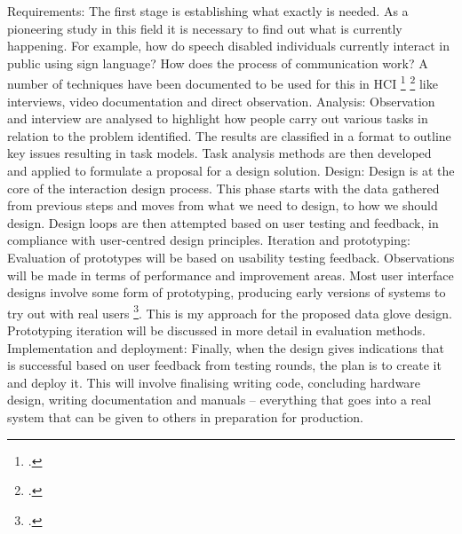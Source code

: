 Requirements: The first stage is establishing what exactly is needed. As a pioneering study in this field it is necessary to find out what is currently happening. For example, how do speech disabled individuals currently interact in public using sign language? How does the process of communication work? 
A number of techniques have been documented to be used for this in HCI \footcite{Dix2004} \footcite{Zimmerman:2007:RTD:1240624.1240704} like interviews, video documentation and direct observation. 
Analysis: Observation and interview are analysed to highlight how people carry out various tasks in relation to the problem identified. The results are classified in a format to outline key issues resulting in task models. Task analysis methods are then developed and applied to formulate a proposal for a design solution. 
Design: Design is at the core of the interaction design process.  This phase starts with the data gathered from previous steps and moves from what we need to design, to how we should design.  Design loops are then attempted based on user testing and feedback, in compliance with user-centred design principles.  
Iteration and prototyping: Evaluation of prototypes will be based on usability testing feedback. Observations will be made in terms of performance and improvement areas.  Most user interface designs involve some form of prototyping, producing early versions of systems to try out with real users \footcite{Bevan1999}. This is my approach for the proposed data glove design. Prototyping iteration will be discussed in more detail in evaluation methods. 
Implementation and deployment: Finally, when the design gives indications that is successful based on user feedback from testing rounds, the plan is to create it and deploy it. This will involve finalising writing code, concluding hardware design, writing documentation and manuals – everything that goes into a real system that can be given to others in preparation for production. 
